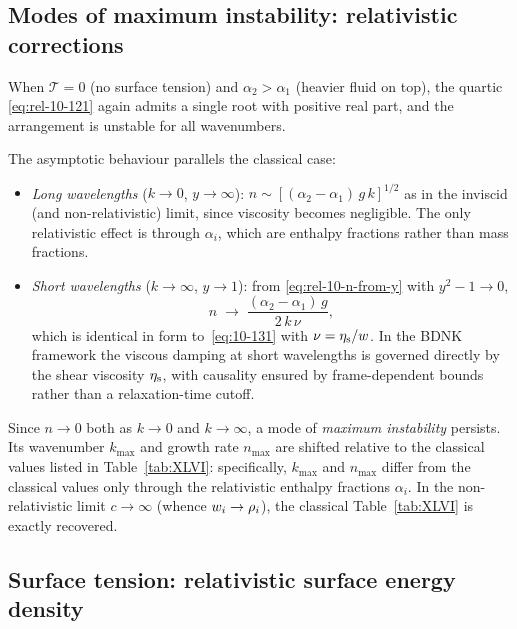 \subsection{Modes of maximum instability: relativistic corrections}
\label{sec:rel-10-94b}

When $\mathcal{T} = 0$ (no surface tension) and
$\alpha_{2} > \alpha_{1}$ (heavier fluid on top), the quartic
\eqref{eq:rel-10-121} again admits a single root with positive real
part, and the arrangement is unstable for all wavenumbers.

The asymptotic behaviour parallels the classical case:
\begin{itemize}
  \item \emph{Long wavelengths} ($k \to 0$, $y \to \infty$):
    $n \sim [(\alpha_{2}-\alpha_{1})\,g\,k]^{1/2}$ as in the
    inviscid (and non-relativistic) limit, since viscosity
    becomes negligible.  The only
    relativistic effect is through $\alpha_{i}$, which are enthalpy
    fractions rather than mass fractions.
  \item \emph{Short wavelengths} ($k \to \infty$, $y \to 1$): from
    \eqref{eq:rel-10-n-from-y} with $y^{2}-1 \to 0$,
    \begin{equation}\label{eq:rel-10-131}
      n \;\to\; \frac{(\alpha_{2}-\alpha_{1})\,g}{2\,k\,\nu},
    \end{equation}
    which is identical in form to~\eqref{eq:10-131} with
    $\nu = \eta_{\mathrm{s}}/w$.  In the BDNK framework the
    viscous damping at short wavelengths is governed directly by
    the shear viscosity $\eta_{\mathrm{s}}$, with causality ensured by
    frame-dependent bounds rather than a relaxation-time cutoff.
\end{itemize}

Since $n \to 0$ both as $k \to 0$ and $k \to \infty$, a mode of
\emph{maximum instability} persists.  Its wavenumber $k_{\max}$ and
growth rate $n_{\max}$ are shifted relative to the classical values
listed in Table~\ref{tab:XLVI}: specifically, $k_{\max}$ and $n_{\max}$ differ from the classical values only
through the relativistic enthalpy fractions $\alpha_i$.  In the
non-relativistic limit $c \to \infty$ (whence
$w_{i} \to \rho_{i}$), the classical
Table~\ref{tab:XLVI} is exactly recovered.

\subsection{Surface tension: relativistic surface energy density}
\label{sec:rel-10-94c}

